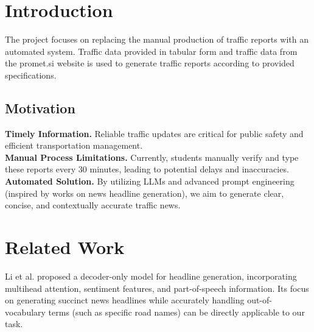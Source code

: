 \documentclass[fleqn,moreauthors,10pt]{ds_report}
\affiliation{\textit{Advisors: Slavko Žitnik}}
\begin{document}
\flushbottom 

\maketitle 

\thispagestyle{empty} 


\section*{Introduction}
The project focuses on replacing the manual production of traffic reports with an automated system. Traffic data provided in tabular form and traffic data from the promet.si website is used to generate traffic reports according to provided specifications.

\subsection*{Motivation}

\textbf{Timely Information.} Reliable traffic updates are critical for public safety and efficient transportation management.\\
\textbf{Manual Process Limitations.} Currently, students manually verify and type these reports every 30 minutes, leading to potential delays and inaccuracies.\\
\textbf{Automated Solution.} By utilizing LLMs and advanced prompt engineering (inspired by works on news headline generation), we aim to generate clear, concise, and contextually accurate traffic news.

\section{Related Work}

Li et al. \cite{liHGNewsNewsHeadline2021} proposed a decoder-only model for headline generation,
incorporating multihead attention, sentiment features, and part-of-speech information. Its focus
on generating succinct news headlines while accurately handling out-of-vocabulary
terms (such as specific road names) can be directly applicable to our task.
\end{document}
